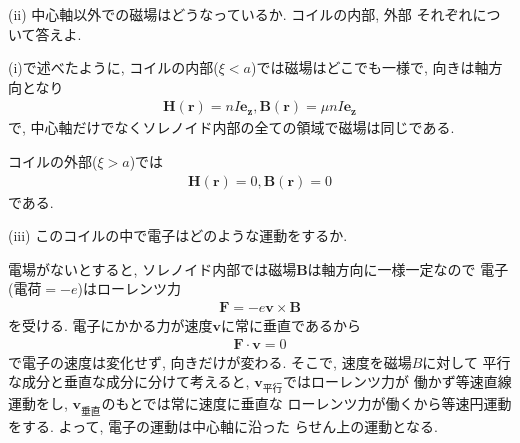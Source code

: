 \documentclass[a4paper,12pt]{jlreq}
\begin{document}





\vspace{10mm}

\begin{itembox}[l]{(ii)}
 中心軸以外での磁場はどうなっているか. コイルの内部, 外部
それぞれについて答えよ. 
\end{itembox}


\vspace{100mm}

\par
(i)で述べたように, コイルの内部($\xi < a$)では磁場はどこでも一様で, 
向きは軸方向となり
\begin{align}
  \bm{H}(\bm{r}) = nI\bm{e_z},　\bm{B}(\bm{r}) = \mu nI\bm{e_z}
\end{align}
で, 中心軸だけでなくソレノイド内部の全ての領域で磁場は同じである. 


コイルの外部($\xi > a$)では
\begin{align}
  \bm{H}(\bm{r}) = 0,　\bm{B}(\bm{r}) = 0
\end{align}
である. 



\vspace{10mm}

\begin{itembox}[l]{(iii)}
 このコイルの中で電子はどのような運動をするか.
\end{itembox}
\par

電場がないとすると, ソレノイド内部では磁場$\bm{B}$は軸方向に一様一定なので
電子(電荷$= -e$)はローレンツ力
\begin{align}
  \bm{F} = -e\bm{v} \times \bm{B}
\end{align}
を受ける. 電子にかかる力が速度$\bm{v}$に常に垂直であるから
\begin{align}
  \bm{F} \cdot \bm{v} = 0
\end{align}
で電子の速度は変化せず, 向きだけが変わる. そこで, 速度を磁場$B$に対して
平行な成分と垂直な成分に分けて考えると, $\bm{v}_{平行}$ではローレンツ力が
働かず等速直線運動をし, $\bm{v}_{垂直}$のもとでは常に速度に垂直な
ローレンツ力が働くから等速円運動をする. よって, 電子の運動は中心軸に沿った
らせん上の運動となる. \par
\end{document}
